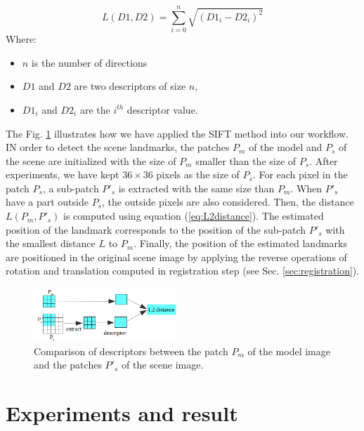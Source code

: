 \documentclass[twoside,twocolumn,10pt]{article}
\begin{document}
\begin{equation}
\label{eq:L2distance}
	L(D1,D2) = \sum\limits_{i = 0}^{n}\sqrt{(D1_i-D2_i)^2}
\end{equation}
Where:
\begin{itemize}[nosep,label=\footnotesize$\bullet$]
	\item $n$ is the number of directions
	\item $D1$ and $D2$ are two descriptors of size $n$,
	\item $D1_i$ and $D2_i $ are the $i^{th}$ descriptor value.
\end{itemize}

The Fig. \ref{fig:Illustrate} illustrates how we have applied the SIFT method into our workflow.
IN order to detect the scene landmarks, the patches \textit{$P_m$} of the model and \textit{$P_s$} of the scene are initialized with the size of $P_m$ smaller than the size of $P_s$.
After experiments, we have kept $36 \times 36$ pixels as the size of \textit{$P_s$}.
For each pixel in the patch \textit{$P_s$}, a sub-patch \textit{$P'_s$} is extracted with the same size than \textit{$P_m$}.
When \textit{$P'_s$} have a part outside \textit{$P_s$}, the outside pixels are also considered.
Then, the distance \textit{$L(P_m,P'_s)$} is computed using equation (\ref{eq:L2distance}).
The estimated position of the landmark corresponds to the position of the sub-patch \textit{$P'_s$} with the smallest distance $L$ to \textit{$P_m$}.
Finally, the position of the estimated landmarks are positioned in the original scene image by applying the reverse operations of rotation and translation computed in registration step (see Sec. \ref{sec:registration}).

\begin{figure}[htbp]
    \centering
    \includegraphics[width=0.48\textwidth]{./images/illustration_SIFT}
    \caption{Comparison of descriptors between the patch $P_m$ of the model image and the patches $P'_s$ of the scene image.}
    \label{fig:Illustrate}
\end{figure}

\section{Experiments and result}
\label{sec:experiments}
\end{document}
